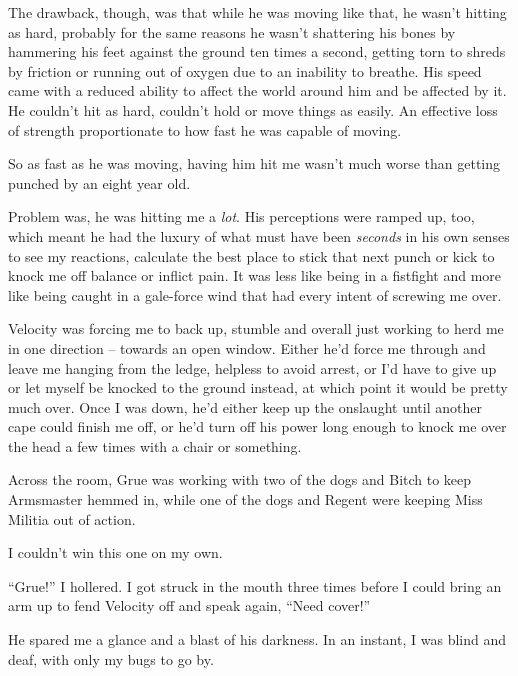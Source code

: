 The drawback, though, was that while he was moving like that, he wasn't hitting as hard, probably for the same reasons he wasn't shattering his bones by hammering his feet against the ground ten times a second, getting torn to shreds by friction or running out of oxygen due to an inability to breathe.  His speed came with a reduced ability to affect the world around him and be affected by it.  He couldn't hit as hard, couldn't hold or move things as easily.  An effective loss of strength proportionate to how fast he was capable of moving.



So as fast as he was moving, having him hit me wasn't much worse than getting punched by an eight year old.



Problem was, he was hitting me a \emph{lot}.  His perceptions were ramped up, too, which meant he had the luxury of what must have been \emph{seconds} in his own senses to see my reactions, calculate the best place to stick that next punch or kick to knock me off balance or inflict pain.  It was less like being in a fistfight and more like being caught in a gale-force wind that had every intent of screwing me over.



Velocity was forcing me to back up, stumble and overall just working to herd me in one direction – towards an open window.  Either he'd force me through and leave me hanging from the ledge, helpless to avoid arrest, or I'd have to give up or let myself be knocked to the ground instead, at which point it would be pretty much over.  Once I was down, he'd either keep up the onslaught until another cape could finish me off, or he'd turn off his power long enough to knock me over the head a few times with a chair or something.



Across the room, Grue was working with two of the dogs and Bitch to keep Armsmaster hemmed in, while one of the dogs and Regent were keeping Miss Militia out of action.



I couldn't win this one on my own.



``Grue!'' I hollered.  I got struck in the mouth three times before I could bring an arm up to fend Velocity off and speak again, ``Need cover!''



He spared me a glance and a blast of his darkness.  In an instant, I was blind and deaf, with only my bugs to go by.



